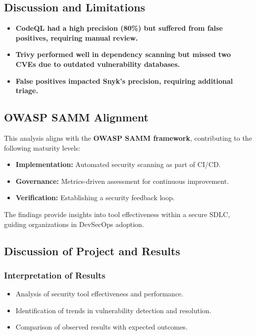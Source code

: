 \documentclass[conference]{IEEEtran}
\begin{document}
\subsection{Discussion and Limitations}

\begin{itemize}
    \item \textbf{CodeQL had a high precision (80\%) but suffered from false positives, requiring manual review.}
    \item \textbf{Trivy performed well in dependency scanning but missed two CVEs due to outdated vulnerability databases.}
    \item \textbf{False positives impacted Snyk's precision, requiring additional triage.}
\end{itemize}

\subsection{OWASP SAMM Alignment}

This analysis aligns with the \cite{OWASP_Samm}\textbf{OWASP SAMM framework}, contributing to the following maturity levels:

\begin{itemize}
    \item \textbf{Implementation:} Automated security scanning as part of CI/CD.
    \item \textbf{Governance:} Metrics-driven assessment for continuous improvement.
    \item \textbf{Verification:} Establishing a security feedback loop.
\end{itemize}

The findings provide insights into tool effectiveness within a secure SDLC, guiding organizations in DevSecOps adoption.

\subsection{Discussion of Project and Results}

\subsubsection{Interpretation of Results}
\begin{itemize}
    \item Analysis of security tool effectiveness and performance.
    \item Identification of trends in vulnerability detection and resolution.
    \item Comparison of observed results with expected outcomes.
\end{itemize}
\end{document}
